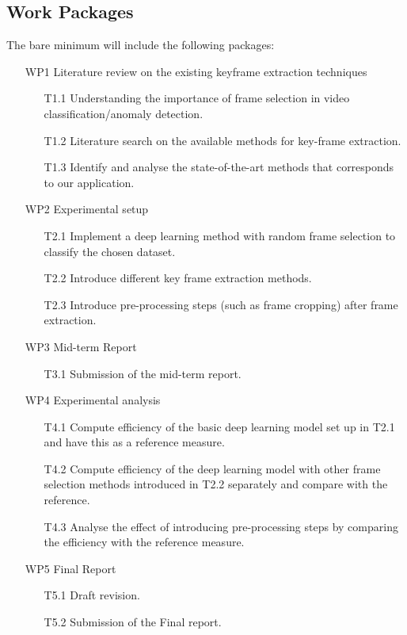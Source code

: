 \documentclass[rnd]{mas_proposal}
\begin{document}
\subsection{Work Packages}
The bare minimum will include the following packages:
\begin{enumerate}
    \item[WP1] Literature review on the existing keyframe extraction techniques
    \begin{itemize}
        \item[T1.1] Understanding the importance of frame selection in video classification/anomaly detection.
        \item[T1.2] Literature search on the available methods for key-frame extraction.
        \item[T1.3] Identify and analyse the state-of-the-art methods that corresponds to our application.
    \end{itemize}
    \item[WP2] Experimental setup
    \begin{itemize}
        \item[T2.1] Implement a deep learning method with random frame selection to classify the chosen dataset.
        \item[T2.2] Introduce different key frame extraction methods.
        \item[T2.3] Introduce pre-processing steps (such as frame cropping) after frame extraction.
    \end{itemize}
    \item[WP3] Mid-term Report
    \begin{itemize}
        \item[T3.1] Submission of the mid-term report.
    \end{itemize}
    \item[WP4] Experimental analysis
    \begin{itemize}
        \item[T4.1] Compute efficiency of the basic deep learning model set up in T2.1 and have this as a reference measure.
        \item[T4.2] Compute efficiency of the deep learning model with other frame selection methods introduced in T2.2 separately and compare with the reference.
        \item[T4.3] Analyse the effect of introducing pre-processing steps by comparing the efficiency with the reference measure.
    \end{itemize}
    \item[WP5] Final Report
    \begin{itemize}
        \item[T5.1] Draft revision.
        \item[T5.2] Submission of the Final report.
    \end{itemize}
    
\end{enumerate}
\end{document}
